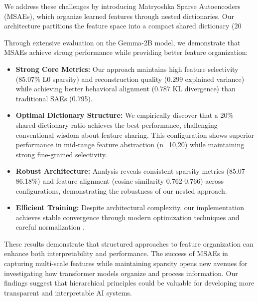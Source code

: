 \documentclass{article} %
\begin{document}
We address these challenges by introducing Matryoshka Sparse Autoencoders (MSAEs), which organize learned features through nested dictionaries. Our architecture partitions the feature space into a compact shared dictionary (20%

Through extensive evaluation on the Gemma-2B model, we demonstrate that MSAEs achieve strong performance while providing better feature organization:

\begin{itemize}
    \item \textbf{Strong Core Metrics:} Our approach maintains high feature selectivity (85.07\% L0 sparsity) and reconstruction quality (0.299 explained variance) while achieving better behavioral alignment (0.787 KL divergence) than traditional SAEs (0.795).
    
    \item \textbf{Optimal Dictionary Structure:} We empirically discover that a 20\% shared dictionary ratio achieves the best performance, challenging conventional wisdom about feature sharing. This configuration shows superior performance in mid-range feature abstraction (n=10,20) while maintaining strong fine-grained selectivity.
    
    \item \textbf{Robust Architecture:} Analysis reveals consistent sparsity metrics (85.07-86.18\%) and feature alignment (cosine similarity 0.762-0.766) across configurations, demonstrating the robustness of our nested approach.
    
    \item \textbf{Efficient Training:} Despite architectural complexity, our implementation achieves stable convergence through modern optimization techniques \cite{kingma2014adam} and careful normalization \cite{ba2016layer}.
\end{itemize}

These results demonstrate that structured approaches to feature organization can enhance both interpretability and performance. The success of MSAEs in capturing multi-scale features while maintaining sparsity opens new avenues for investigating how transformer models organize and process information. Our findings suggest that hierarchical principles could be valuable for developing more transparent and interpretable AI systems.
\end{document}
